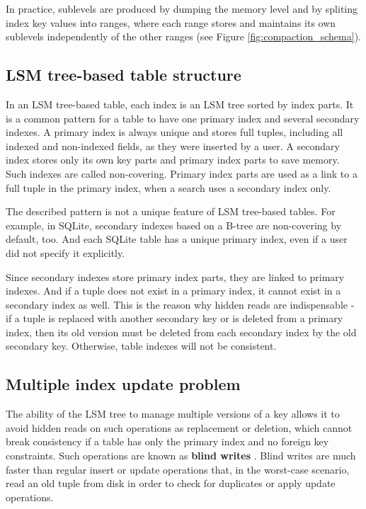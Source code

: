 \documentclass{vldb}
\begin{document}
In practice, sublevels are produced by dumping the memory level and by spliting index
key values into ranges, where each range stores and maintains its own sublevels
independently of the other ranges (see Figure \ref{fig:compaction_schema}).

\subsection{LSM tree-based table structure}
In an LSM tree-based table, each index is an LSM tree sorted by index parts.
It is a common pattern for a table to have one primary index and several
secondary indexes. A primary index is always unique and stores full tuples,
including all indexed and non-indexed fields, as they were inserted by a user.
A secondary index stores only its own key parts and primary index parts to save
memory. Such indexes are called non-covering. Primary index parts are used as a link to
a full tuple in the primary index, when a search uses a secondary index only.

The described pattern is not a unique feature of LSM tree-based tables. For
example, in SQLite, secondary indexes based on a B-tree are non-covering by default,
too. And each SQLite table has a unique primary index, even if a user did not
specify it explicitly.

Since secondary indexes store primary index parts, they are linked to primary
indexes. And if a tuple does not exist in a primary index, it cannot exist in a
secondary index as well. This is the reason why hidden reads are
indispensable - if a tuple is replaced with another secondary key or is deleted
from a primary index, then its old version must be deleted from each secondary
index by the old secondary key. Otherwise, table indexes will not be consistent.

\subsection{Multiple index update problem}
The ability of the LSM tree to manage multiple versions of a key allows it to avoid hidden
reads on such operations as replacement or deletion, which cannot break consistency if
a table has only the primary index and no foreign key constraints. Such operations are known
as \textbf{blind writes} \cite{kai:slimdb}. Blind writes are much faster than regular insert
or update operations that, in the worst-case scenario, read an old tuple from disk in order
to check for duplicates or apply update operations.
\end{document}
